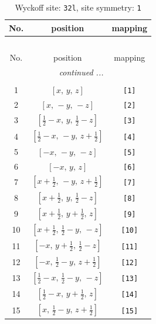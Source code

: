 \documentclass[fleqn,8pt]{jsarticle}
\begin{document}
\renewcommand{\arraystretch}{1.2}
\begin{longtable}{ccc}
\caption{Wyckoff site: {\tt 32l}, site symmetry: {\tt 1}}
 \\
 \hline \hline
No. & position & mapping \\ \hline \endfirsthead

\multicolumn{2}{l}{\tablename\ \thetable{}} \\
 \hline \hline
No. & position & mapping \\ \hline \endhead

 \hline \hline
\multicolumn{2}{r}{\footnotesize\it continued ...} \\ \endfoot

 \hline \hline
\multicolumn{2}{r}{} \\ \endlastfoot

1 & $\left[ x,\, y,\, z \right]$ & {\tt [1]} \\ \hline
2 & $\left[ x,\, - y,\, - z \right]$ & {\tt [2]} \\ \hline
3 & $\left[ \frac{1}{2} - x,\, y,\, \frac{1}{2} - z \right]$ & {\tt [3]} \\ \hline
4 & $\left[ \frac{1}{2} - x,\, - y,\, z + \frac{1}{2} \right]$ & {\tt [4]} \\ \hline
5 & $\left[ - x,\, - y,\, - z \right]$ & {\tt [5]} \\ \hline
6 & $\left[ - x,\, y,\, z \right]$ & {\tt [6]} \\ \hline
7 & $\left[ x + \frac{1}{2},\, - y,\, z + \frac{1}{2} \right]$ & {\tt [7]} \\ \hline
8 & $\left[ x + \frac{1}{2},\, y,\, \frac{1}{2} - z \right]$ & {\tt [8]} \\ \hline
9 & $\left[ x + \frac{1}{2},\, y + \frac{1}{2},\, z \right]$ & {\tt [9]} \\ \hline
10 & $\left[ x + \frac{1}{2},\, \frac{1}{2} - y,\, - z \right]$ & {\tt [10]} \\ \hline
11 & $\left[ - x,\, y + \frac{1}{2},\, \frac{1}{2} - z \right]$ & {\tt [11]} \\ \hline
12 & $\left[ - x,\, \frac{1}{2} - y,\, z + \frac{1}{2} \right]$ & {\tt [12]} \\ \hline
13 & $\left[ \frac{1}{2} - x,\, \frac{1}{2} - y,\, - z \right]$ & {\tt [13]} \\ \hline
14 & $\left[ \frac{1}{2} - x,\, y + \frac{1}{2},\, z \right]$ & {\tt [14]} \\ \hline
15 & $\left[ x,\, \frac{1}{2} - y,\, z + \frac{1}{2} \right]$ & {\tt [15]} \\ \hline

\end{longtable}
\end{document}
